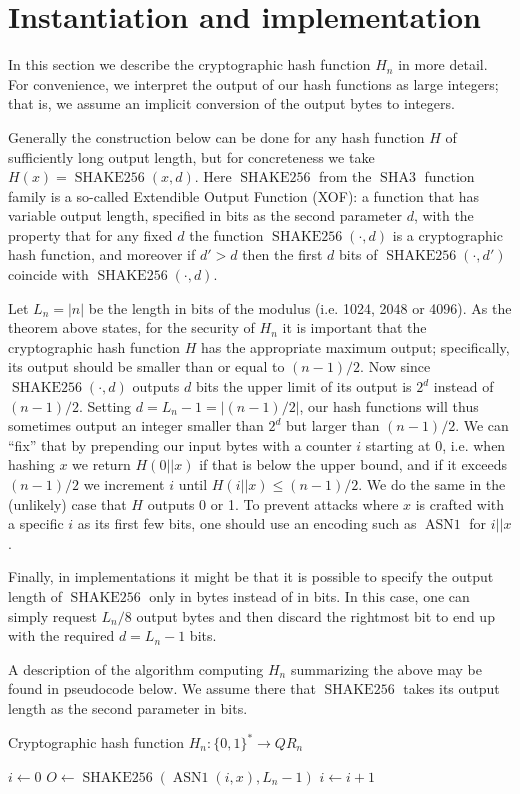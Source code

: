 \documentclass[a4paper,12pt]{article}
\DeclareMathOperator{\shake}{SHAKE256}
\DeclareMathOperator{\asn}{ASN1}
\DeclareMathOperator{\sha}{SHA3}
\begin{document}
\section{Instantiation and implementation}
In this section we describe the cryptographic hash function $H_n$ in more detail. For convenience, we interpret the output of our hash functions as large integers; that is, we assume an implicit conversion of the output bytes to integers.

Generally the construction below can be done for any hash function $H$ of sufficiently long output length, but for concreteness we take $H(x) = \shake(x, d)$. Here $\shake$ from the $\sha$ function family is a so-called Extendible Output Function (XOF): a function that has variable output length, specified in bits as the second parameter $d$, with the property that for any fixed $d$ the function $\shake(\cdot, d)$ is a cryptographic hash function, and moreover if $d' > d$ then the first $d$ bits of $\shake(\cdot, d')$ coincide with $\shake(\cdot, d)$.

Let $L_n = |n|$ be the length in bits of the modulus (i.e. 1024, 2048 or 4096). As the theorem above states, for the security of $H_n$ it is important that the cryptographic hash function $H$ has the appropriate maximum output; specifically, its output should be smaller than or equal to $(n-1)/2$. Now since $\shake(\cdot, d)$ outputs $d$ bits the upper limit of its output is $2^d$ instead of $(n-1)/2$. Setting $d = L_n-1 = |(n-1)/2|$, our hash functions will thus sometimes output an integer smaller than $2^d$ but larger than $(n-1)/2$. We can ``fix'' that by prepending our input bytes with a counter $i$ starting at 0, i.e. when hashing $x$ we return $H(0 || x)$ if that is below the upper bound, and if it exceeds $(n-1)/2$ we increment $i$ until $H(i || x) \leq (n-1)/2$. We do the same in the (unlikely) case that $H$ outputs 0 or 1. To prevent attacks where $x$ is crafted with a specific $i$ as its first few bits, one should use an encoding such as $\asn$ for $i || x$.

Finally, in implementations it might be that it is possible to specify the output length of $\shake$ only in bytes instead of in bits. In this case, one can simply request $L_n/8$ output bytes and then discard the rightmost bit to end up with the required $d = L_n-1$ bits.

A description of the algorithm computing $H_n$ summarizing the above may be found in pseudocode below. We assume there that $\shake$ takes its output length as the second parameter in bits.

\begin{algorithm}
  \caption{Cryptographic hash function $H_n : \{0,1\}^* \to QR_n$}
  \begin{algorithmic}
      \State $i \gets 0$
      \Repeat
        \State $O \gets \shake(\asn(i, x), L_n-1)$
        \State $i \gets i + 1$
      \State {}
    \EndFunction
  \end{algorithmic}
\end{algorithm}
\end{document}
